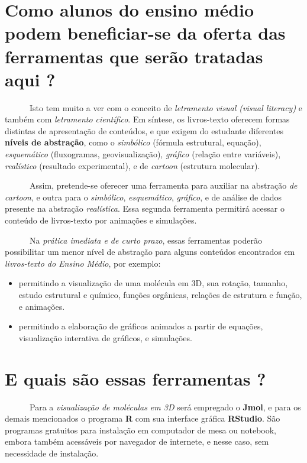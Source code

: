 \documentclass[
  letterpaper,
  DIV=11,
  numbers=noendperiod]{scrreprt}
\providecommand{\tightlist}{%
  \setlength{\itemsep}{0pt}\setlength{\parskip}{0pt}}\usepackage{longtable,booktabs,array}
\begin{document}
\section{Como alunos do ensino médio podem beneficiar-se da oferta das
ferramentas que serão tratadas aqui
?}\label{como-alunos-do-ensino-muxe9dio-podem-beneficiar-se-da-oferta-das-ferramentas-que-seruxe3o-tratadas-aqui}

~~~~~~Isto tem muito a ver com o conceito de \emph{letramento visual
(visual literacy)} e também com \emph{letramento científico}. Em
síntese, os livros-texto oferecem formas distintas de apresentação de
conteúdos, e que exigem do estudante diferentes \textbf{níveis de
abstração}, como o \emph{simbólico} (fórmula estrutural, equação),
\emph{esquemático} (fluxogramas, geovisualização), \emph{gráfico}
(relação entre variáveis), \emph{realístico} (resultado experimental), e
de \emph{cartoon} (estrutura molecular).

~~~~~~Assim, pretende-se oferecer uma ferramenta para auxiliar na
abstração \emph{de cartoon}, e outra para o \emph{simbólico},
\emph{esquemático}, \emph{gráfico}, e de análise de dados presente na
abstração \emph{realística}. Essa segunda ferramenta permitirá acessar o
conteúdo de livros-texto por animações e simulações.

~~~~~~Na \emph{prática imediata e de curto prazo}, essas ferramentas
poderão possibilitar um menor nível de abstração para alguns conteúdos
encontrados em \emph{livros-texto do Ensino Médio}, por exemplo:

\begin{itemize}
\tightlist
\item
  permitindo a visualização de uma molécula em 3D, sua rotação, tamanho,
  estudo estrutural e químico, funções orgânicas, relações de estrutura
  e função, e animações.
\item
  permitindo a elaboração de gráficos animados a partir de equações,
  visualização interativa de gráficos, e simulações.
\end{itemize}

\section{E quais são essas ferramentas
?}\label{e-quais-suxe3o-essas-ferramentas}

~~~~~~Para a \emph{visualização de moléculas em 3D} será empregado o
\textbf{Jmol}, e para os demais mencionados o programa \textbf{R} com
sua interface gráfica \textbf{RStudio}. São programas gratuitos para
instalação em computador de mesa ou notebook, embora também acessáveis
por navegador de internete, e nesse caso, sem necessidade de instalação.
\end{document}
